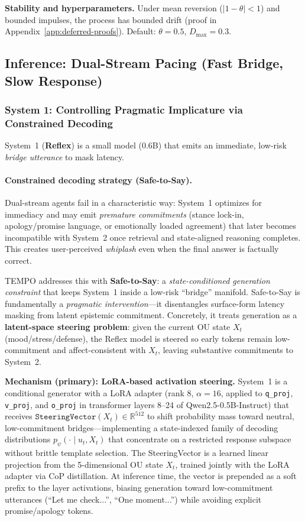 \documentclass[11pt]{article}
\begin{document}
\textbf{Stability and hyperparameters.} Under mean reversion ($|1-\theta|<1$) and bounded impulses, the process has bounded drift (proof in Appendix~\ref{app:deferred-proofs}). Default: $\theta=0.5$, $D_{\max}=0.3$.

\subsection{Inference: Dual-Stream Pacing (Fast Bridge, Slow Response)}
\label{sec:dual-stream}

\subsubsection{System 1: Controlling Pragmatic Implicature via Constrained Decoding}
System~1 (\textbf{Reflex}) is a small model (0.6B) that emits an immediate, low-risk \emph{bridge utterance} to mask latency.

\paragraph{Constrained decoding strategy (Safe-to-Say).}
Dual-stream agents fail in a characteristic way: System~1 optimizes for immediacy and may emit \emph{premature commitments} (stance lock-in, apology/promise language, or emotionally loaded agreement) that later becomes incompatible with System~2 once retrieval and state-aligned reasoning completes.
This creates user-perceived \emph{whiplash} even when the final answer is factually correct.

TEMPO addresses this with \textbf{Safe-to-Say}: a \emph{state-conditioned generation constraint} that keeps System~1 inside a low-risk ``bridge'' manifold.
Safe-to-Say is fundamentally a \textit{pragmatic intervention}---it disentangles surface-form latency masking from latent epistemic commitment. Concretely, it treats generation as a \textbf{latent-space steering problem}: given the current OU state $X_t$ (mood/stress/defense), the Reflex model is steered so early tokens remain low-commitment and affect-consistent with $X_t$, leaving substantive commitments to System~2.

\textbf{Mechanism (primary): LoRA-based activation steering.}
System~1 is a conditional generator with a LoRA adapter (rank 8, $\alpha{=}16$, applied to \texttt{q\_proj}, \texttt{v\_proj}, and \texttt{o\_proj} in transformer layers 8--24 of Qwen2.5-0.5B-Instruct) that receives $\texttt{SteeringVector}(X_t)\in\mathbb{R}^{512}$ to shift probability mass toward neutral, low-commitment bridges---implementing a state-indexed family of decoding distributions $p_{\psi}(\cdot\mid u_t, X_t)$ that concentrate on a restricted response subspace without brittle template selection. The SteeringVector is a learned linear projection from the 5-dimensional OU state $X_t$, trained jointly with the LoRA adapter via CoP distillation. At inference time, the vector is prepended as a soft prefix to the layer activations, biasing generation toward low-commitment utterances (``Let me check...'', ``One moment...'') while avoiding explicit promise/apology tokens.
\end{document}
